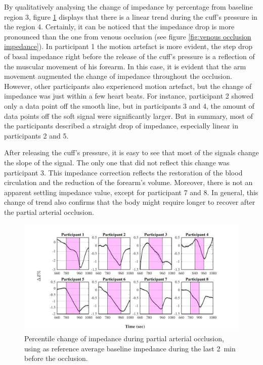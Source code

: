 By qualitatively analysing the change of impedance by percentage from baseline region 3, figure \ref{fig:arterial occlusion imepdance} displays that there is a linear trend during the cuff's pressure in the region 4. Certainly, it can be noticed that the impedance drop is more pronounced than the one from venous occlusion (see figure \ref{fig:venous occlusion impedance}). In participant 1 the motion artefact is more evident, the step drop of basal impedance right before the release of the cuff's pressure is a reflection of the muscular movement of his forearm. In this case, it is evident that the arm movement augmented the change of impedance throughout the occlusion. However, other participants also experienced motion artefact, but the change of impedance was just within a few heart beats. For instance, participant 2 showed only a data point off the smooth line, but in participants 3 and 4, the amount of data points off the soft signal were significantly larger. But in summary, most of the participants described a straight drop of impedance, especially linear in participants 2 and 5. 

After releasing the cuff's pressure, it is easy to see that most of the signals change the slope of the signal. The only one that did not reflect this change was participant 3. This impedance correction reflects the restoration of the blood circulation and the reduction of the forearm's volume. Moreover, there is not an apparent settling impedance value, except for participant 7 and 8. In general, this change of trend also confirms that the body might require longer to recover after the partial arterial occlusion.

\begin{figure}[htbp]
	\centering
	\includegraphics[width=15cm,keepaspectratio]{figure_vop_5}    
	\caption[Percentile variation of impedance during partial arterial occlusion]{Percentile change of impedance during partial arterial occlusion, using as reference average baseline impedance during the last \SI{2}{\minute} before the occlusion.}
	\label{fig:arterial occlusion imepdance}
\end{figure}  

